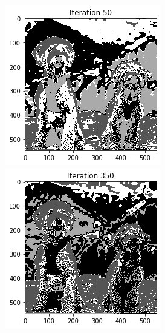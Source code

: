 \documentclass[11pt]{article}
\begin{document}
\begin{figure}[!htb]
\begin{center}
\begin{multicols}{5}
	\includegraphics[height = \linewidth]{dogs_50}\par
	\includegraphics[height = \linewidth]{dogs_350}\par

\end{multicols}
\end{center}
\end{figure}
\end{document}
